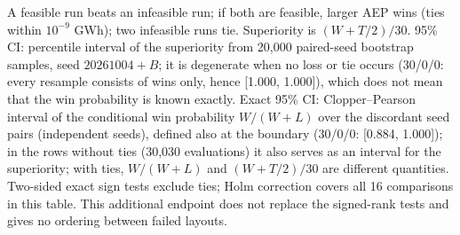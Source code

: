 \begin{table}[!htbp]
\par\smallskip\parbox{\textwidth}{\footnotesize A feasible run beats an infeasible run; if both are feasible, larger AEP wins (ties within $10^{-9}$ GWh); two infeasible runs tie. Superiority is $(W+T/2)/30$. 95\% CI: percentile interval of the superiority from 20,000 paired-seed bootstrap samples, seed $20261004+B$; it is degenerate when no loss or tie occurs (30/0/0: every resample consists of wins only, hence [1.000, 1.000]), which does not mean that the win probability is known exactly. Exact 95\% CI: Clopper--Pearson interval of the conditional win probability $W/(W+L)$ over the discordant seed pairs (independent seeds), defined also at the boundary (30/0/0: [0.884, 1.000]); in the rows without ties (30,030 evaluations) it also serves as an interval for the superiority; with ties, $W/(W+L)$ and $(W+T/2)/30$ are different quantities. Two-sided exact sign tests exclude ties; Holm correction covers all 16 comparisons in this table. This additional endpoint does not replace the signed-rank tests and gives no ordering between failed layouts.}
\end{table}
